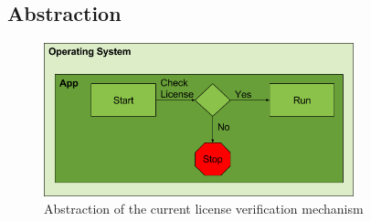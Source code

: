 \subsection{Abstraction} \label{subsection:license-abstraction}
\begin{figure}[h]
    \centering
    \includegraphics[width=0.8\textwidth]{data/verificationNow.png}
    \caption{Abstraction of the current license verification mechanism}
    \label{fig:verificationNow}
\end{figure}
